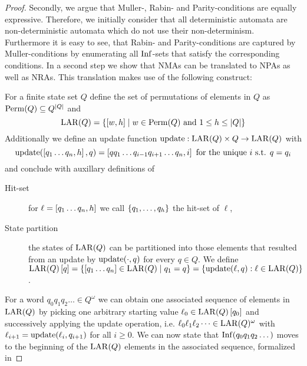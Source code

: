 \begin{proof}
  Secondly, we argue that Muller-, Rabin- and Parity-conditions are
  equally expressive. Therefore, we initially consider that all deterministic
  automata are non-deterministic automata which do not use their
  non-determinism. Furthermore it is easy to see, that Rabin- and
  Parity-conditions are captured by Muller-conditions by enumerating all
  $\operatorname{Inf}$-sets that satisfy the corresponding conditions. In a second step we
  show that \acp{NMA} can be translated to \acp{NPA} as well as \acp{NRA}. This
  translation makes use of the following construct:
  \begin{definition}
    For a finite state set $Q$ define the set of permutations of elements in
    $Q$ as $\operatorname{Perm}(Q)\subseteq Q^{\left\vert{Q}\right\vert}$ and
    \begin{equation*}
      \operatorname{LAR}(Q) = \left\{\left[w,h\right]\mid w\in\operatorname{Perm}(Q)\text{ and }1\leq
      h\leq\left\vert{Q}\right\vert\right\}
    \end{equation*}
    Additionally we define an update function
    $\operatorname{update}:\operatorname{LAR}(Q)\times Q\rightarrow\operatorname{LAR}(Q)$ with
    \begin{equation*}
      \operatorname{update}(\left[q_{1}\dots q_{n},h\right], q)
      = \left[qq_{1}\dots q_{i-1}q_{i+1}\dots q_{n},i\right]
      \text{ for the unique }i\text{ s.t. }q=q_{i}
    \end{equation*}
    and conclude with auxillary definitions of
    \begin{description}
      \item [Hit-set] for $\ell = \left[q_{1}\dots q_{n},h\right]$ we call
        $\left\{q_{1},\dots,q_{h}\right\}$ the hit-set of $\ell$,
      \item [State partition] the states of $\operatorname{LAR}(Q)$ can be partitioned into
        those elements that resulted from an update by $\operatorname{update}(\cdot, q)$ for
        every $q\in Q$. We define
        $\operatorname{LAR}(Q)\left[q\right] = \left\{\left[q_{1}\dots q_{n}\right]\in\operatorname{LAR}(Q)\mid
          q_{1} = q\right\} = \left\{\operatorname{update}(\ell, q):\ell\in\operatorname{LAR}(Q)\right\}$.
    \end{description}
  \end{definition}
  For a word $q_{0}q_{1}q_{2}\dots\in Q^{\omega}$ we can obtain one associated
  sequence of elements in $\operatorname{LAR}(Q)$ by picking one arbitrary starting value
  $\ell_{0}\in\operatorname{LAR}(Q)\left[q_{0}\right]$ and successively applying the update
  operation, i.e. $\ell_{0}\ell_{1}\ell_{2}\dots\in\operatorname{LAR}(Q)^{\omega}$ with
  $\ell_{i+1} = \operatorname{update}(\ell_{i},q_{i+1})$ for all $i\geq 0$. We can now state that
  $\operatorname{Inf}(q_{0}q_{1}q_{2}\dots)$ moves to the beginning of the $\operatorname{LAR}(Q)$ elements 
  in the associated sequence, formalized in

\end{proof}
